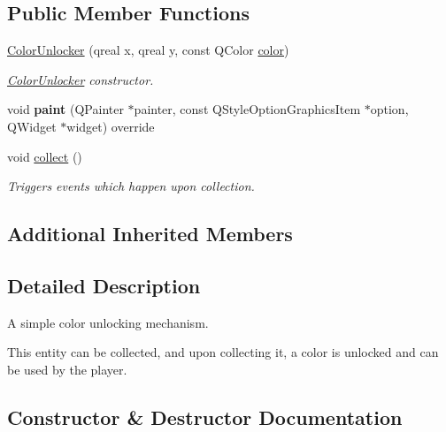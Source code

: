 \subsection*{Public Member Functions}
\begin{DoxyCompactItemize}
\item 
\hyperlink{class_color_unlocker_a83e389003c9f59ca846fde8e40649b71}{Color\+Unlocker} (qreal x, qreal y, const Q\+Color \hyperlink{class_entity_ad14bf88ca550e2e5b13438a3faf545e6}{color})
\begin{DoxyCompactList}\small\item\em \hyperlink{class_color_unlocker}{Color\+Unlocker} constructor. \end{DoxyCompactList}\item 
\mbox{\label{class_color_unlocker_aacda57c79576474b5e737eee68c95ad8}} 
void {\bfseries paint} (Q\+Painter $\ast$painter, const Q\+Style\+Option\+Graphics\+Item $\ast$option, Q\+Widget $\ast$widget) override
\item 
\mbox{\label{class_color_unlocker_aad8a31681246fdda571902f7e2023d35}} 
void \hyperlink{class_color_unlocker_aad8a31681246fdda571902f7e2023d35}{collect} ()
\begin{DoxyCompactList}\small\item\em Triggers events which happen upon collection. \end{DoxyCompactList}\end{DoxyCompactItemize}
\subsection*{Additional Inherited Members}


\subsection{Detailed Description}
A simple color unlocking mechanism. 

This entity can be collected, and upon collecting it, a color is unlocked and can be used by the player. 

\subsection{Constructor \& Destructor Documentation}
\mbox{\label{class_color_unlocker_a83e389003c9f59ca846fde8e40649b71}} 
